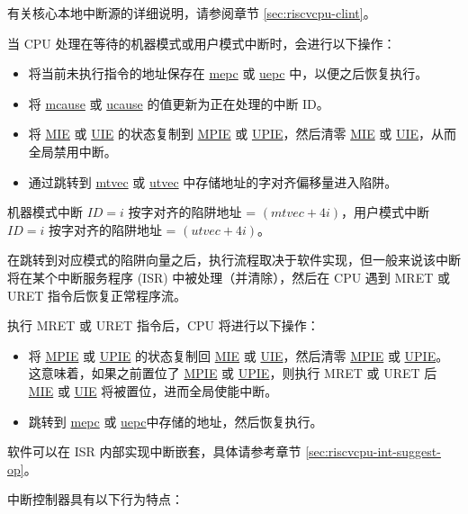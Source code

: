 \documentclass[main\_\_CN.tex]{subfiles}
\begin{document}
有关核心本地中断源的详细说明，请参阅章节 \ref{sec:riscvcpu-clint}。

当 CPU 处理在等待的机器模式或用户模式中断时，会进行以下操作：
\begin{itemize}
    \item 将当前未执行指令的地址保存在 \hyperref[regdesc:MEPC]{mepc} 或 \hyperref[regdesc:UEPC]{uepc} 中，以便之后恢复执行。
    \item 将 \hyperref[regdesc:MCAUSE]{mcause} 或 \hyperref[regdesc:UCAUSE]{ucause} 的值更新为正在处理的中断 ID。
    \item 将 \hyperref[fielddesc:MSTATUSMIE]{MIE} 或 \hyperref[fielddesc:USTATUSUIE]{UIE} 的状态复制到 \hyperref[fielddesc:MSTATUSMPIE]{MPIE} 或 \hyperref[fielddesc:USTATUSUPIE]{UPIE}，然后清零 \hyperref[fielddesc:MSTATUSMIE]{MIE} 或 \hyperref[fielddesc:USTATUSUIE]{UIE}，从而全局禁用中断。
    \item 通过跳转到 \hyperref[regdesc:MTVEC]{mtvec} 或 \hyperref[regdesc:UTVEC]{utvec} 中存储地址的字对齐偏移量进入陷阱。
\end{itemize}

机器模式中断 $ID=i$ 按字对齐的陷阱地址 = $(\hyperref[fielddesc:MTVECBASE]{mtvec} + 4i)$，用户模式中断 $ID=i$ 按字对齐的陷阱地址 = $(\hyperref[fielddesc:UTVECBASE]{utvec} + 4i)$。

在跳转到对应模式的陷阱向量之后，执行流程取决于软件实现，但一般来说该中断将在某个中断服务程序 (ISR) 中被处理（并清除），然后在 CPU 遇到 MRET 或 URET 指令后恢复正常程序流。

执行 MRET 或 URET 指令后，CPU 将进行以下操作：
\begin{itemize}
    \item 将 \hyperref[fielddesc:MSTATUSMPIE]{MPIE} 或 \hyperref[fielddesc:MSTATUSUPIE]{UPIE} 的状态复制回 \hyperref[fielddesc:MSTATUSMIE]{MIE} 或 \hyperref[fielddesc:USTATUSUIE]{UIE}，然后清零 \hyperref[fielddesc:MSTATUSMPIE]{MPIE} 或 \hyperref[fielddesc:USTATUSUPIE]{UPIE}。这意味着，如果之前置位了 \hyperref[fielddesc:MSTATUSMPIE]{MPIE} 或 \hyperref[fielddesc:USTATUSUPIE]{UPIE}，则执行 MRET 或 URET 后 \hyperref[fielddesc:MSTATUSMIE]{MIE} 或 \hyperref[fielddesc:USTATUSUIE]{UIE} 将被置位，进而全局使能中断。
    \item 跳转到 \hyperref[regdesc:MEPC]{mepc} 或 \hyperref[regdesc:UEPC]{uepc}中存储的地址，然后恢复执行。
\end{itemize}

软件可以在 ISR 内部实现中断嵌套，具体请参考章节 \ref{sec:riscvcpu-int-suggest-op}。

中断控制器具有以下行为特点：
\end{document}
